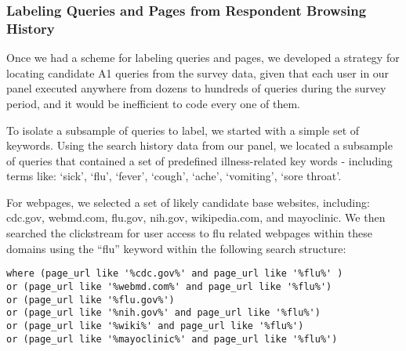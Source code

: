 \documentclass[12pt]{article}
\begin{document}
\subsubsection{Labeling Queries and Pages from Respondent Browsing History}

Once we had a scheme for labeling queries and pages, we developed a strategy for locating candidate A1 queries from the survey data, given that each user in our panel executed anywhere from dozens to hundreds of queries during the survey period, and it would be inefficient to code every one of them. 

To isolate a subsample of queries to label, we started with a simple set of keywords. Using the search history data from our panel, we located a subsample of queries that contained a set of predefined illness-related key words - including terms like: `sick', `flu', `fever', `cough', `ache', `vomiting', `sore throat'. 


For webpages, we selected a set of likely candidate base websites, including: cdc.gov, webmd.com, flu.gov, nih.gov, wikipedia.com, and mayoclinic. We then searched the clickstream for user access to flu related webpages within these domains using the ``flu'' keyword within the following search structure:

\begin{lstlisting}
where (page_url like '%cdc.gov%' and page_url like '%flu%' )
or (page_url like '%webmd.com%' and page_url like '%flu%')
or (page_url like '%flu.gov%')
or (page_url like '%nih.gov%' and page_url like '%flu%')
or (page_url like '%wiki%' and page_url like '%flu%')
or (page_url like '%mayoclinic%' and page_url like '%flu%')
\end{lstlisting} 
\end{document}
